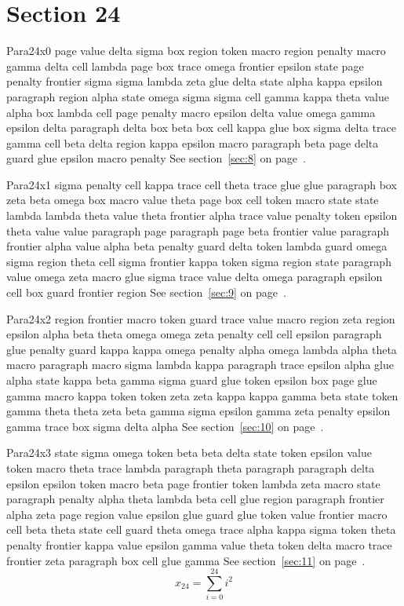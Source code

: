 \documentclass{article}
\begin{document}
\section{Section 24}\label{sec:24}
Para24x0 page value delta sigma box region token macro region penalty macro gamma delta cell lambda page box trace omega frontier epsilon state page penalty frontier sigma sigma lambda zeta glue delta state alpha kappa epsilon paragraph region alpha state omega sigma sigma cell gamma kappa theta value alpha box lambda cell page penalty macro epsilon delta value omega gamma epsilon delta paragraph delta box beta box cell kappa glue box sigma delta trace gamma cell beta delta region kappa epsilon macro paragraph beta page delta guard glue epsilon macro penalty See section~\ref{sec:8} on page~\pageref{sec:32}.

Para24x1 sigma penalty cell kappa trace cell theta trace glue glue paragraph box zeta beta omega box macro value theta page box cell token macro state state lambda lambda theta value theta frontier alpha trace value penalty token epsilon theta value value paragraph page paragraph page beta frontier value paragraph frontier alpha value alpha beta penalty guard delta token lambda guard omega sigma region theta cell sigma frontier kappa token sigma region state paragraph value omega zeta macro glue sigma trace value delta omega paragraph epsilon cell box guard frontier region See section~\ref{sec:9} on page~\pageref{sec:33}.

Para24x2 region frontier macro token guard trace value macro region zeta region epsilon alpha beta theta omega omega zeta penalty cell cell epsilon paragraph glue penalty guard kappa kappa omega penalty alpha omega lambda alpha theta macro paragraph macro sigma lambda kappa paragraph trace epsilon alpha glue alpha state kappa beta gamma sigma guard glue token epsilon box page glue gamma macro kappa token token zeta zeta kappa kappa gamma beta state token gamma theta theta zeta beta gamma sigma epsilon gamma zeta penalty epsilon gamma trace box sigma delta alpha See section~\ref{sec:10} on page~\pageref{sec:34}.

Para24x3 state sigma omega token beta beta delta state token epsilon value token macro theta trace lambda paragraph theta paragraph paragraph delta epsilon epsilon token macro beta page frontier token lambda zeta macro state paragraph penalty alpha theta lambda beta cell glue region paragraph frontier alpha zeta page region value epsilon glue guard glue token value frontier macro cell beta theta state cell guard theta omega trace alpha kappa sigma token theta penalty frontier kappa value epsilon gamma value theta token delta macro trace frontier zeta paragraph box cell glue gamma See section~\ref{sec:11} on page~\pageref{sec:35}.
\begin{equation} x_{24} = \sum_{i=0}^{24} i^2 \label{eq:24}\end{equation}
\end{document}
